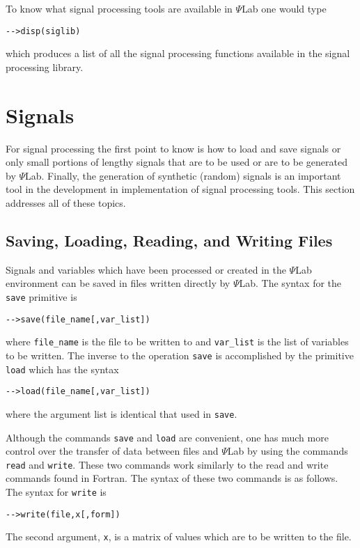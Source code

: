     To know what signal processing tools
are available in $\Psi$Lab one would type
\begin{verbatim}
-->disp(siglib)
\end{verbatim}
which produces a list of all the signal processing functions available
in the signal processing library.  

\section{Signals}

	For signal processing the first point to know is how to load and 
save signals or  only small portions of lengthy signals that are to be
used or are to be generated by $\Psi$Lab.  Finally, the generation of
synthetic (random) signals is an important tool in the development
in implementation of signal processing tools.  This section addresses
all of these topics.

\subsection{Saving, Loading, Reading, and Writing Files}

	Signals and variables which have been processed or created
in the $\Psi$Lab environment can be saved in files written directly
by $\Psi$Lab.  The syntax for the {\tt save} primitive is 
\begin{verbatim}
-->save(file_name[,var_list])
\end{verbatim}
where {\tt file\_name} is the file to be written to and {\tt var\_list}
is the list of variables to be written.
  The inverse to the
operation {\tt save} is accomplished by the primitive {\tt load}
which has the syntax
\begin{verbatim}
-->load(file_name[,var_list])
\end{verbatim}
where the argument list is identical that used in {\tt save}.

	Although the commands {\tt save} and {\tt load} are
convenient, one has much more control over the transfer of
data between files and $\Psi$Lab by using the commands {\tt read}
and {\tt write}.  These two commands work similarly to the
read and write commands found in Fortran.  The syntax of these
two commands is as follows.  The syntax for {\tt write} is
\begin{verbatim}
-->write(file,x[,form])
\end{verbatim}
  The second argument, {\tt x}, is a matrix of values which are to be 
written to the file.

